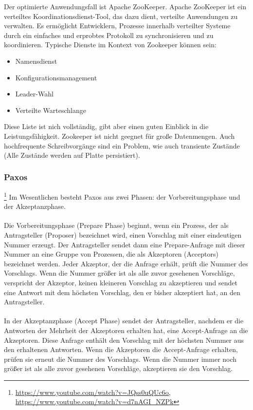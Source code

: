 Der optimierte Anwendungsfall ist Apache ZooKeeper. Apache ZooKeeper ist ein verteiltes Koordinationsdienst-Tool, das dazu dient, verteilte Anwendungen zu verwalten. Es ermöglicht Entwicklern, Prozesse innerhalb verteilter Systeme durch ein einfaches und erprobtes Protokoll zu synchronisieren und zu koordinieren.
Typische Dienste im Kontext von Zookeeper können sein:

\begin{itemize}
\item Namensdienst
\item Konfigurationsmanagement
\item Leader-Wahl
\item Verteilte Warteschlange
\end{itemize}
Diese Liste ist nich vollständig, gibt aber einen guten Einblick in die Leistungsfähigkeit. Zookeeper ist nicht geegnet für große Datenmengen. Auch hochfrequente Schreibvorgänge sind ein Problem, wie auch transiente Zustände (Alle Zustände werden auf Platte persistiert).


\subsubsection{Paxos}\footnote{\url{https://www.youtube.com/watch?v=JQss0uQUc6o}, \url{https://www.youtube.com/watch?v=d7nAGI_NZPk}}
Im Wesentlichen besteht Paxos aus zwei Phasen: der Vorbereitungsphase und der Akzeptanzphase.
\\\\
Die Vorbereitungsphase (Prepare Phase) beginnt, wenn ein Prozess, der als Antragsteller (Proposer) bezeichnet wird, einen Vorschlag mit einer eindeutigen Nummer erzeugt. Der Antragsteller sendet dann eine Prepare-Anfrage mit dieser Nummer an eine Gruppe von Prozessen, die als Akzeptoren (Acceptors) bezeichnet werden. Jeder Akzeptor, der die Anfrage erhält, prüft die Nummer des Vorschlags. Wenn die Nummer größer ist als alle zuvor gesehenen Vorschläge, verspricht der Akzeptor, keinen kleineren Vorschlag zu akzeptieren und sendet eine Antwort mit dem höchsten Vorschlag, den er bisher akzeptiert hat, an den Antragsteller.
\\\\
In der Akzeptanzphase (Accept Phase) sendet der Antragsteller, nachdem er die Antworten der Mehrheit der Akzeptoren erhalten hat, eine Accept-Anfrage an die Akzeptoren. Diese Anfrage enthält den Vorschlag mit der höchsten Nummer aus den erhaltenen Antworten. Wenn die Akzeptoren die Accept-Anfrage erhalten, prüfen sie erneut die Nummer des Vorschlags. Wenn die Nummer immer noch größer ist als alle zuvor gesehenen Vorschläge, akzeptieren sie den Vorschlag.

